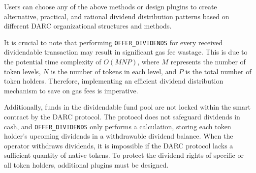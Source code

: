 \documentclass[main.tex]{subfiles}
\begin{document}
Users can choose any of the above methods or design plugins to create alternative, practical, and rational dividend distribution patterns based on different DARC organizational structures and methods.

It is crucial to note that performing \texttt{OFFER\_DIVIDENDS} for every received dividendable transaction may result in significant gas fee wastage. This is due to the potential time complexity of $O(MNP)$, where $M$ represents the number of token levels, $N$ is the number of tokens in each level, and $P$ is the total number of token holders. Therefore, implementing an efficient dividend distribution mechanism to save on gas fees is imperative.

Additionally, funds in the dividendable fund pool are not locked within the smart contract by the DARC protocol. The protocol does not safeguard dividends in cash, and \texttt{OFFER\_DIVIDENDS} only performs a calculation, storing each token holder's upcoming dividends in a withdrawable dividend balance. When the operator withdraws dividends, it is impossible if the DARC protocol lacks a sufficient quantity of native tokens. To protect the dividend rights of specific or all token holders, additional plugins must be designed.
\end{document}
